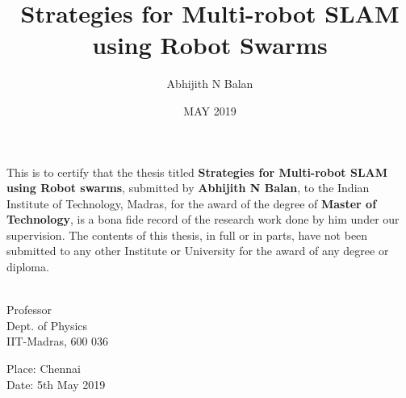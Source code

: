 \documentclass[MTech]{iitmdiss}
\begin{document}

\title{Strategies for Multi-robot SLAM using Robot Swarms}

\author{Abhijith N Balan}

\date{MAY 2019}

\maketitle

\certificate

\vspace*{0.5in}

\noindent This is to certify that the thesis titled {\bf Strategies for Multi-robot SLAM using Robot swarms}, submitted by {\bf Abhijith N Balan}, 
  to the Indian Institute of Technology, Madras, for
the award of the degree of {\bf Master of Technology}, is a bona fide
record of the research work done by him under our supervision.  The
contents of this thesis, in full or in parts, have not been submitted
to any other Institute or University for the award of any degree or
diploma.

\vspace*{1.5in}

\begin{singlespacing}
\hspace*{-0.25in}
\parbox{2.5in}{
 \\
\noindent Professor \\
\noindent Dept. of Physics\\
\noindent IIT-Madras, 600 036 \\
} 
\hspace*{1.0in} 
\end{singlespacing}
\vspace*{0.25in}
\noindent Place: Chennai\\
Date: 5th May 2019 
\end{document}
